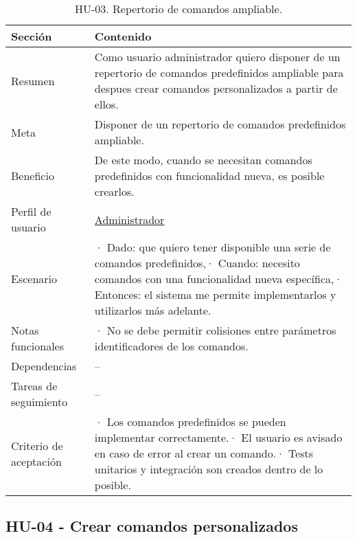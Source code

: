 \begin{table}[H]
    \centering
    \def\arraystretch{1.25}
    \begin{adjustbox}{max width=\textwidth}
    \begin{tabularx}{\textwidth}{|l|L|}
    \hline
        \textbf{Sección} & \textbf{Contenido} \\ \hline
    \hline
        Resumen & Como usuario administrador quiero disponer de un repertorio de comandos predefinidos ampliable para despues crear comandos personalizados a partir de ellos. \\ \hline
        Meta & Disponer de un repertorio de comandos predefinidos ampliable. \\ \hline
        Beneficio & De este modo, cuando se necesitan comandos predefinidos con funcionalidad nueva, es posible crearlos. \\ \hline
        Perfil de usuario & \hyperref[sec:personaAdmin]{Administrador} \\ \hline
        Escenario & · Dado: que quiero tener disponible una serie de comandos predefinidos,\linebreak · Cuando: necesito comandos con una funcionalidad nueva específica,\linebreak · Entonces: el sistema me permite implementarlos y utilizarlos más adelante. \\ \hline
        Notas funcionales & · No se debe permitir colisiones entre parámetros identificadores de los comandos. \\ \hline
        Dependencias & – \\ \hline
        Tareas de seguimiento & – \\ \hline
        Criterio de aceptación & · Los comandos predefinidos se pueden implementar correctamente.\linebreak · El usuario es avisado en caso de error al crear un comando.\linebreak · Tests unitarios y integración son creados dentro de lo posible. \\ \hline
    \end{tabularx}
    \end{adjustbox}
    \caption{HU-03. Repertorio de comandos ampliable.}
\end{table}

\subsection{HU-04 - Crear comandos personalizados}
\label{sec:hu04}

